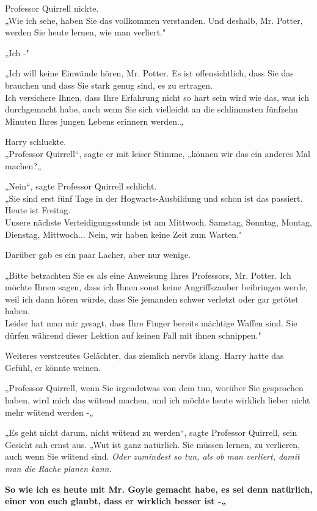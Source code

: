 {Professor Quirrell nickte.\\ „Wie ich sehe, haben Sie das vollkommen verstanden. Und deshalb, Mr. Potter, werden Sie heute lernen, wie man verliert."

„Ich -"

„Ich will keine Einwände hören, Mr. Potter. Es ist offensichtlich, dass Sie das brauchen und dass Sie stark genug sind, es zu ertragen.\\ Ich versichere Ihnen, dass Ihre Erfahrung nicht so hart sein wird wie das, was ich durchgemacht habe, auch wenn Sie sich vielleicht an die schlimmsten fünfzehn Minuten Ihres jungen Lebens erinnern werden.„

Harry schluckte.\\ „Professor Quirrell“, sagte er mit leiser Stimme, „können wir das ein anderes Mal machen?„

„Nein“, sagte Professor Quirrell schlicht.\\ „Sie sind erst fünf Tage in der Hogwarts-Ausbildung und schon ist das passiert. Heute ist Freitag.\\ Unsere nächste Verteidigungsstunde ist am Mittwoch. Samstag, Sonntag, Montag, Dienstag, Mittwoch... Nein, wir haben keine Zeit zum Warten."

Darüber gab es ein paar Lacher, aber nur wenige.

„Bitte betrachten Sie es als eine Anweisung Ihres Professors, Mr. Potter. Ich möchte Ihnen sagen, dass ich Ihnen sonst keine Angriffszauber beibringen werde, weil ich dann hören würde, dass Sie jemanden schwer verletzt oder gar getötet haben.\\ Leider hat man mir gesagt, dass Ihre Finger bereits mächtige Waffen sind. Sie dürfen während dieser Lektion auf keinen Fall mit ihnen schnippen."

Weiteres verstreutes Gelächter, das ziemlich nervös klang. Harry hatte das Gefühl, er könnte weinen.

„Professor Quirrell, wenn Sie irgendetwas von dem tun, worüber Sie gesprochen haben, wird mich das wütend machen, und ich möchte heute wirklich lieber nicht mehr wütend werden -„

„Es geht nicht darum, nicht wütend zu werden“, sagte Professor Quirrell, sein Gesicht sah ernst aus. „Wut ist ganz natürlich. Sie müssen lernen, zu verlieren, auch wenn Sie wütend sind. \emph{Oder zumindest so tun, als ob man verliert, damit man die Rache planen kann.}

\textbf{So wie ich es heute mit Mr. Goyle gemacht habe, es sei denn natürlich, einer von euch glaubt, dass er wirklich besser ist -„}

}
